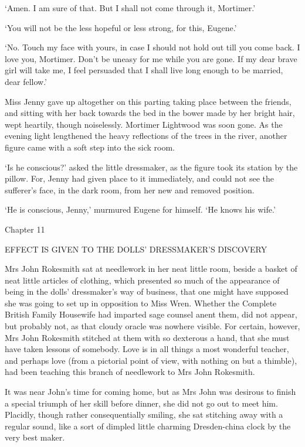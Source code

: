‘Amen. I am sure of that. But I shall not come through it, Mortimer.’

‘You will not be the less hopeful or less strong, for this, Eugene.’

‘No. Touch my face with yours, in case I should not hold out till you
come back. I love you, Mortimer. Don’t be uneasy for me while you are
gone. If my dear brave girl will take me, I feel persuaded that I shall
live long enough to be married, dear fellow.’

Miss Jenny gave up altogether on this parting taking place between the
friends, and sitting with her back towards the bed in the bower made by
her bright hair, wept heartily, though noiselessly. Mortimer Lightwood
was soon gone. As the evening light lengthened the heavy reflections of
the trees in the river, another figure came with a soft step into the
sick room.

‘Is he conscious?’ asked the little dressmaker, as the figure took its
station by the pillow. For, Jenny had given place to it immediately, and
could not see the sufferer’s face, in the dark room, from her new and
removed position.

‘He is conscious, Jenny,’ murmured Eugene for himself. ‘He knows his
wife.’



Chapter 11

EFFECT IS GIVEN TO THE DOLLS’ DRESSMAKER’S DISCOVERY


Mrs John Rokesmith sat at needlework in her neat little room, beside a
basket of neat little articles of clothing, which presented so much of
the appearance of being in the dolls’ dressmaker’s way of business, that
one might have supposed she was going to set up in opposition to Miss
Wren. Whether the Complete British Family Housewife had imparted sage
counsel anent them, did not appear, but probably not, as that cloudy
oracle was nowhere visible. For certain, however, Mrs John Rokesmith
stitched at them with so dexterous a hand, that she must have taken
lessons of somebody. Love is in all things a most wonderful teacher,
and perhaps love (from a pictorial point of view, with nothing on but
a thimble), had been teaching this branch of needlework to Mrs John
Rokesmith.

It was near John’s time for coming home, but as Mrs John was desirous to
finish a special triumph of her skill before dinner, she did not go out
to meet him. Placidly, though rather consequentially smiling, she sat
stitching away with a regular sound, like a sort of dimpled little
charming Dresden-china clock by the very best maker.

